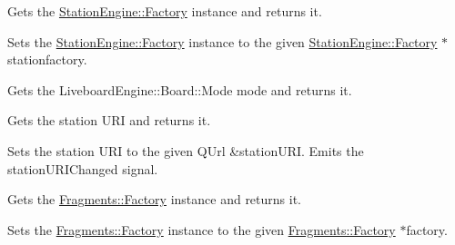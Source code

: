 Gets the \mbox{\hyperlink{classStationEngine_1_1Factory}{Station\+Engine\+::\+Factory}} instance and returns it.

Sets the \mbox{\hyperlink{classStationEngine_1_1Factory}{Station\+Engine\+::\+Factory}} instance to the given \mbox{\hyperlink{classStationEngine_1_1Factory}{Station\+Engine\+::\+Factory}} $\ast$stationfactory.

Gets the Liveboard\+Engine\+::\+Board\+::\+Mode mode and returns it.

Gets the station U\+RI and returns it.

Sets the station U\+RI to the given Q\+Url \&station\+U\+RI. Emits the station\+U\+R\+I\+Changed signal.

Gets the \mbox{\hyperlink{classFragments_1_1Factory}{Fragments\+::\+Factory}} instance and returns it.

Sets the \mbox{\hyperlink{classFragments_1_1Factory}{Fragments\+::\+Factory}} instance to the given \mbox{\hyperlink{classFragments_1_1Factory}{Fragments\+::\+Factory}} $\ast$factory. 